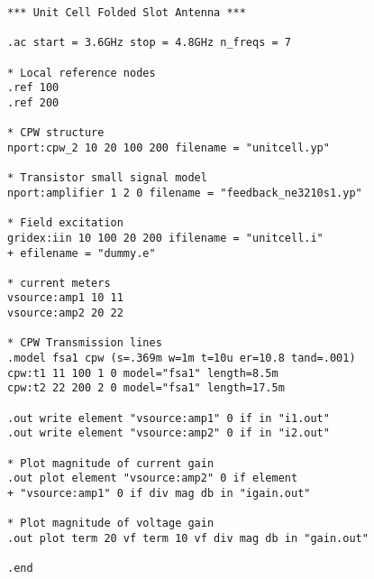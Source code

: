 {
\begin{verbatim}
*** Unit Cell Folded Slot Antenna ***

.ac start = 3.6GHz stop = 4.8GHz n_freqs = 7 

* Local reference nodes
.ref 100
.ref 200

* CPW structure
nport:cpw_2 10 20 100 200 filename = "unitcell.yp" 

* Transistor small signal model
nport:amplifier 1 2 0 filename = "feedback_ne3210s1.yp" 

* Field excitation
gridex:iin 10 100 20 200 ifilename = "unitcell.i" 
+ efilename = "dummy.e" 

* current meters
vsource:amp1 10 11 
vsource:amp2 20 22

* CPW Transmission lines
.model fsa1 cpw (s=.369m w=1m t=10u er=10.8 tand=.001)
cpw:t1 11 100 1 0 model="fsa1" length=8.5m
cpw:t2 22 200 2 0 model="fsa1" length=17.5m

.out write element "vsource:amp1" 0 if in "i1.out"
.out write element "vsource:amp2" 0 if in "i2.out"

* Plot magnitude of current gain
.out plot element "vsource:amp2" 0 if element 
+ "vsource:amp1" 0 if div mag db in "igain.out"

* Plot magnitude of voltage gain
.out plot term 20 vf term 10 vf div mag db in "gain.out"

.end
\end{verbatim}}

